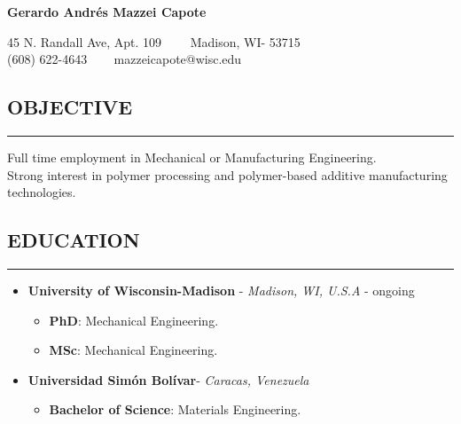 \documentclass[11pt,letterpaper]{article}
\newenvironment{indentsection}[1]%
{\begin{list}{}%
	{\setlength{\leftmargin}{#1}}%
	\item[]%
}
{\end{list}}
\begin{document}
	\thispagestyle{firststyle}
	
\begin{center}
	{\LARGE \textbf{Gerardo Andrés Mazzei Capote}}

	45 N. Randall Ave, Apt. 109\ \ \textbullet
	\ \ Madison, WI- 53715
	\\
	(608) 622-4643 \ \textbullet
	\ \ mazzeicapote@wisc.edu
\end{center}

\vspace{-1em}

\subsection*{OBJECTIVE}
	\vspace{-0.5em}
	\hrule
	\vspace{0.4em}
	\begin{indentsection}{\parindent}
		Full time employment in Mechanical or Manufacturing Engineering.\\
		Strong interest in polymer processing and polymer-based additive manufacturing technologies.
	\end{indentsection}


\subsection*{EDUCATION}
	\vspace{-0.5em}
	\hrule
	\vspace{0.4em}
	\begin{itemize}
	\item
	\textbf{University of Wisconsin-Madison} - \emph{Madison, WI, U.S.A} - ongoing
	\begin{itemize}	
	\item
	\textbf{PhD}: Mechanical Engineering. 
	\item
	\textbf{MSc}: Mechanical Engineering.
\end{itemize}

	\item
	\textbf{Universidad Simón Bolívar}- \emph{Caracas, Venezuela}
	\begin{itemize}	
		\item
		\textbf{Bachelor of Science}: Materials Engineering. 
	\end{itemize}
	\end{itemize}
\end{document}
